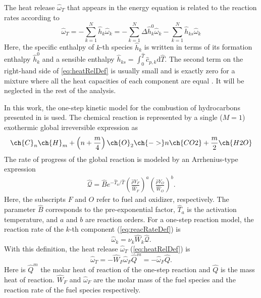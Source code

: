 The heat release $\hat \omega_T$ that appears in the energy equation is related to the reaction rates according to
\begin{equation}\label{eq:heatRelDef}
	\hat \omega _T = - \sum_{k=1}^{N} \hat h_k\hat\omega_k = - \sum_{k=1}^{N}   \Delta \hat h_k^0 \hat\omega_k   - \sum_{k=1}^{N} \hat h_{ks} \hat\omega_k
\end{equation}
Here, the specific enthalpy of $k$-th species $\hat h_k$  is written in terms of its formation enthalpy $\hat h_k^0$ and a sensible enthalpy $\hat h_{ks} =\int_{0}^{\hat{T}} \hat c_{p,k} \text{d}\hat{T} $. The second term on the right-hand side of \cref{eq:heatRelDef} is usually small and is exactly zero for a mixture where all the heat capacities of each component are equal \parencite{poinsotTheoreticalNumericalCombustion2005}. It will be neglected in the rest of the analysis.
\newline

In this work,  the one-step kinetic model for the combustion of hydrocarbons presented in \textcite{fernandez-tarrazoSimpleOnestepChemistry2006} is used. The chemical reaction is represented by a single ($M = 1$)  exothermic global irreversible expression as
\begin{equation}
	\ch{C}_n \ch{H}_m + \left(n+\frac{m}{4}\right) \ch{O}_2\ch{ -> } n \ch{CO2} + \frac{m}{2} \ch{H2O}
\end{equation}%
The rate of progress of the global reaction is modeled by an Arrhenius-type expression
\begin{align}
	\hat{\mathcal{Q}}= \hat B e^{-\hat T_a/\hat T} \left(\frac{\hat \rho Y_F}{\hat W_F}\right)^a \left(\frac{\hat \rho Y_O}{\hat W_O}\right)^b . \label{eq:DimArr}
\end{align}%
Here, the subscripts $F$ and $O$ refer to fuel and oxidizer, respectively. The parameter $\hat{B}$ corresponds to the pre-exponential factor, $\hat T_a$ is the activation temperature, and $a$ and $b$ are reaction orders. For a one-step reaction model, the reaction rate of the $k$-th component (\cref{eq:reacRateDef}) is
\begin{equation}
	\hat \omega_k  =  \nu_{k} \hat W_k\hat{\mathcal{Q}}.
\end{equation}
With this definition, the heat release $\hat \omega_T$ (\cref{eq:heatRelDef}) is
\begin{equation}
	\hat \omega_T = - \hat W_F \hat \omega_F\hat Q^m = - \hat \omega_F\hat Q .
\end{equation}
Here is $\hat Q^m$ the molar heat of reaction of the one-step reaction and $\hat Q$ is the mass heat of reaction. $\hat W_F$ and $ \hat \omega_F$ are the molar mass of the fuel species and the reaction rate of the fuel species respectively.

